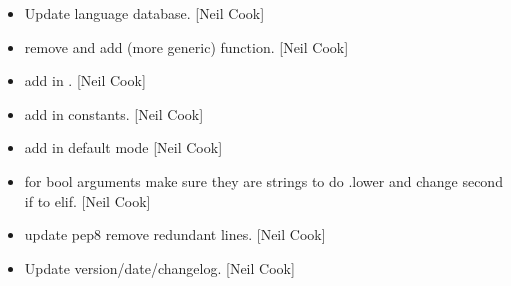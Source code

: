 \documentclass[a4paper,10pt,english]{report}
\begin{document}
\begin{itemize}
\item {} 
Update language database. {[}Neil Cook{]}

\item {} 
 \sphinxhyphen{} remove  and add (more generic)
 function. {[}Neil Cook{]}

\item {} 
 \sphinxhyphen{} add in . {[}Neil Cook{]}

\item {} 
 \sphinxhyphen{} add in 
constants. {[}Neil Cook{]}

\item {} 
 \sphinxhyphen{} add in default mode  {[}Neil
Cook{]}

\item {} 
 \sphinxhyphen{} for bool arguments make sure
they are strings to do .lower and change second if to elif. {[}Neil
Cook{]}

\item {} 
 \sphinxhyphen{} update pep8 remove redundant lines. {[}Neil
Cook{]}

\item {} 
Update version/date/changelog. {[}Neil Cook{]}

\end{itemize}
\end{document}

